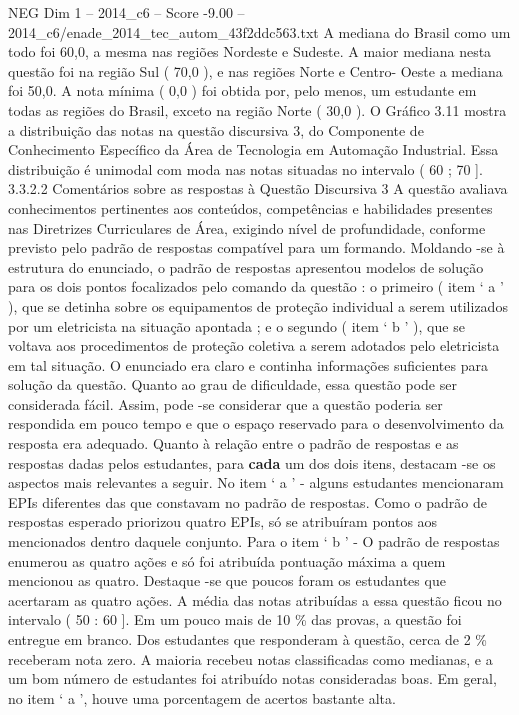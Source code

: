 \begin{textsample}{NEG Dim 1 – 2014\_c6 – Score -9.00 – 2014\_c6/enade\_2014\_tec\_autom\_43f2ddc563.txt}
A mediana do Brasil como um todo foi 60,0, a mesma nas regiões Nordeste e Sudeste.
A maior mediana nesta questão foi na região Sul ( 70,0 ), e nas regiões Norte e Centro- Oeste a mediana foi 50,0.
A nota mínima ( 0,0 ) foi obtida por, pelo menos, um estudante em todas as regiões do Brasil, exceto na região Norte ( 30,0 ).
O Gráfico 3.11 mostra a distribuição das notas na questão discursiva 3, do Componente de Conhecimento Específico da Área de Tecnologia em Automação Industrial.
Essa distribuição é unimodal com moda nas notas situadas no intervalo ( 60 ; 70 ]. 3.3.2.2 Comentários sobre as respostas à Questão Discursiva 3 A questão avaliava conhecimentos pertinentes aos conteúdos, competências e habilidades presentes nas Diretrizes Curriculares de Área, exigindo nível de profundidade, conforme previsto pelo padrão de respostas compatível para um formando.
Moldando -se à estrutura do enunciado, o padrão de respostas apresentou modelos de solução para os dois pontos focalizados pelo comando da questão : o primeiro ( item ‘ a ’ ), que se detinha sobre os equipamentos de proteção individual a serem utilizados por um eletricista na situação apontada ; e o segundo ( item ‘ b ’ ), que se voltava aos procedimentos de proteção coletiva a serem adotados pelo eletricista em tal situação.
O enunciado era claro e continha informações suficientes para solução da questão.
Quanto ao grau de dificuldade, essa questão pode ser considerada fácil.
Assim, pode -se considerar que a questão poderia ser respondida em pouco tempo e que o espaço reservado para o desenvolvimento da resposta era adequado.
Quanto à relação entre o padrão de respostas e as respostas dadas pelos estudantes, para \textbf{cada} um dos dois itens, destacam -se os aspectos mais relevantes a seguir.
No item ‘ a ’ - alguns estudantes mencionaram EPIs diferentes das que constavam no padrão de respostas.
Como o padrão de respostas esperado priorizou quatro EPIs, só se atribuíram pontos aos mencionados dentro daquele conjunto.
Para o item ‘ b ’ - O padrão de respostas enumerou as quatro ações e só foi atribuída pontuação máxima a quem mencionou as quatro.
Destaque -se que poucos foram os estudantes que acertaram as quatro ações.
A média das notas atribuídas a essa questão ficou no intervalo ( 50 : 60 ].
Em um pouco mais de 10 \% das provas, a questão foi entregue em branco.
Dos estudantes que responderam à questão, cerca de 2 \% receberam nota zero.
A maioria recebeu notas classificadas como medianas, e a um bom número de estudantes foi atribuído notas consideradas boas.
Em geral, no item ‘ a ’, houve uma porcentagem de acertos bastante alta.

\end{textsample}

